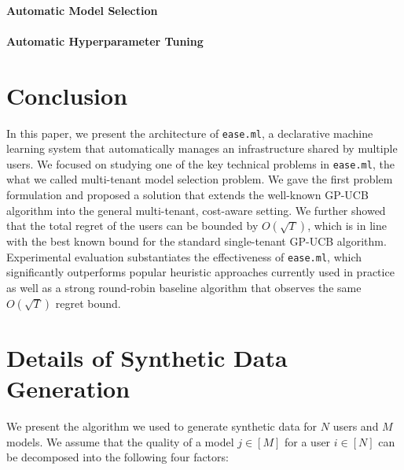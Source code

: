 \documentclass[letterpaper]{vldb}
\newcommand{\eml}{\texttt{ease.ml}\xspace}
\begin{document}
\paragraph*{Automatic Model Selection}

\paragraph*{Automatic Hyperparameter Tuning}

\section{Conclusion}\label{sec:conclusion}

In this paper, we present the architecture of \eml, a declarative machine learning system that automatically manages an infrastructure shared by multiple users.
We focused on studying one of the key technical problems in \eml, the what we called multi-tenant model selection problem.
We gave the first problem formulation and proposed a solution that extends the well-known GP-UCB algorithm into the general multi-tenant, cost-aware setting.
We further showed that the total regret of the users can be bounded by $O(\sqrt{T})$, which is in line with the best known bound for the standard single-tenant GP-UCB algorithm.
Experimental evaluation substantiates the effectiveness of \eml, which significantly outperforms popular heuristic approaches currently used in practice as well as a strong round-robin baseline algorithm that observes the same $O(\sqrt{T})$ regret bound.


  



\appendix

\section{Details of Synthetic Data Generation}\label{sec:appendix:synthetic}

We present the algorithm we used to generate synthetic data for $N$ users and $M$ models.
We assume that the quality of a model $j\in[M]$ for a user $i\in[N]$ can be decomposed into the following four factors:
\end{document}
